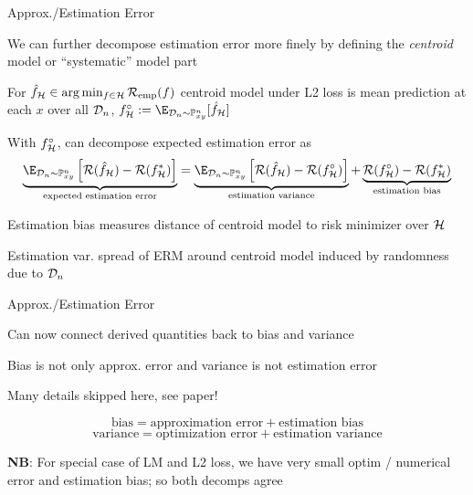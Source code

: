 \documentclass[11pt,compress,t,notes=noshow, xcolor=table]{beamer}
\begin{document}
\begin{framei}[sep=M]{Approx./Estimation Error }

\item We can further decompose estimation error more finely by defining the \textit{centroid} model or ``systematic'' model part

\item For $\hat{f}_{\mathcal{H}} \in  \arg\min_{f \in \mathcal{H}} \mathcal{R}_{\text{emp}}(f)$ centroid model under L2 loss is mean prediction at each $x$ over all $\mathcal{D}_n$, $f^{\circ}_{\Hspace} := \E_{\D_n \sim \Pxy^n}[\fh_{\Hspace}] $

\item With $f^{\circ}_{\mathcal{H}}$, can decompose expected estimation error as
$$
 \underbrace{\E_{\D_n \sim \Pxy^n}\left[\risk(\hat{f}_{\Hspace}) - \risk(f ^{\ast}_{\Hspace})\right]}_{\text{expected estimation error}} = \underbrace{\E_{\D_n \sim \Pxy^n}\left[\risk(\hat{f}_{\Hspace}) - \risk(f^{\circ}_{\Hspace}) \right]}_{\text{estimation variance}} + \underbrace{\risk(f^{\circ}_{\Hspace})-\risk(f^{\ast}_{\Hspace})}_{\text{estimation bias}}   
$$


\item Estimation bias measures distance of centroid model to risk minimizer over $\mathcal{H}$
\item Estimation var. spread of ERM around centroid model induced by randomness due to $\mathcal{D}_n$

\end{framei}

\begin{framei}[sep=M]{Approx./Estimation Error }


\item Can now connect derived quantities back to bias and variance 
\item Bias is not only approx. error and variance is not estimation error
\item Many details skipped here, see paper!

$$ \text{bias} = \text{approximation error} + \text{estimation bias} $$
$$\text{variance} = \text{optimization error} + \text{estimation variance}$$


\item \textbf{NB}: For special case of LM and L2 loss, we have very small optim / numerical error and estimation bias; so both decomps agree

\end{framei}

\endlecture
\end{document}
